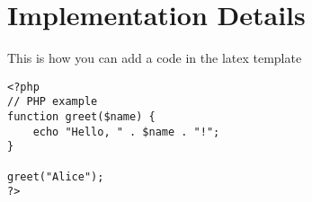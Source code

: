 \section{Implementation Details}
This is how you can add a code in the latex template
\begin{lstlisting}[caption={Simple PHP Greeting Function}]
<?php
// PHP example
function greet($name) {
    echo "Hello, " . $name . "!";
}

greet("Alice");
?>
\end{lstlisting}
